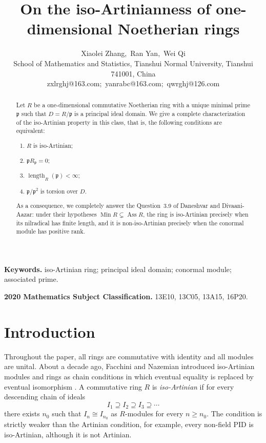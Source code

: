 \documentclass[11pt]{article}
\title{ On the iso-Artinianness of one-dimensional Noetherian rings}
\author{Xiaolei Zhang,\ Ran Yan,\ Wei Qi\\
\small School of Mathematics and Statistics, Tianshui Normal University,
 Tianshui 741001, China\\
zxlrghj@163.com;\ yanrabc@163.com;\  qwrghj@126.com}
\date{}
\theoremstyle{definition}
\newcommand{\Ass}{\operatorname{Ass}}
\newcommand{\Min}{\operatorname{Min}}
\newcommand{\len}{\operatorname{length}}
\begin{document}
\maketitle

\begin{abstract}
Let $R$ be a one-dimensional commutative Noetherian ring with a unique minimal prime
$\mathfrak p$ such that $D=R/\mathfrak p$ is a principal ideal domain.  We give a
complete  characterization of the iso-Artinian property in this class, that is, the
following conditions are equivalent:
\begin{enumerate}[label=\textup{(\roman*)}]
	\item $R$ is iso-Artinian;
	\item $\mathfrak pR_{\mathfrak p}=0$;
	\item $\len_R(\mathfrak p)<\infty$;
	\item $\mathfrak p/\mathfrak p^2$  is torsion over $D$.
\end{enumerate} 

As a consequence, we completely answer the  Question~3.9 of Daneshvar and Divaani-Aazar:
under their hypotheses $\Min R\subsetneq\Ass R$, the ring is iso-Artinian precisely when its
nilradical has finite length, and it is non-iso-Artinian precisely when the conormal module has
positive rank. 
\end{abstract}

\medskip
\noindent\textbf{Keywords.} iso-Artinian ring; principal ideal domain;  conormal
module;  associated prime.

\medskip
\noindent\textbf{2020 Mathematics Subject Classification.} 13E10, 13C05, 13A15, 16P20.

\section{Introduction}

Throughout the paper, all rings are commutative with identity and all modules are unital. About a decade ago, Facchini and Nazemian introduced iso-Artinian modules and rings as chain conditions in which
eventual equality is replaced by eventual isomorphism
\cite{FacchiniNazemian2016,FacchiniNazemian2017,FacchiniNazemian2019}.  A
commutative ring $R$ is \emph{iso-Artinian} if for every descending chain of ideals
\[
 I_1\supseteq I_2\supseteq I_3\supseteq\cdots
\]
there exists $n_0$ such that $I_n\cong I_{n_0}$ as $R$-modules for every $n\ge n_0$.
The condition is strictly weaker than the Artinian condition, for example, every non-field PID is
iso-Artinian, although it is not Artinian.
\end{document}
